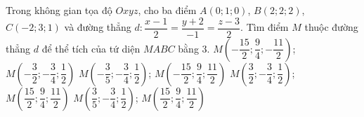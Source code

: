 \begin{ex}%
Trong không gian tọa độ $Oxyz$, cho ba điểm $A(0;1;0)$, $B(2;2;2)$, $C(-2;3;1)$  và đường thẳng $d:\dfrac{x-1}{2} = \dfrac{y+2}{-1} = \dfrac{z-3}{2}$. Tìm điểm $M$ thuộc đường thẳng $d$ để thể tích của tứ diện $MABC$ bằng $3$. 
\choice
{\True $M\left ( -\dfrac{15}{2} ; \dfrac{9}{4}; -\dfrac{11}{2}\right )$; $M\left ( -\dfrac{3}{2} ; -\dfrac{3}{4}; \dfrac{1}{2}\right )$}
{$M\left ( -\dfrac{3}{5} ; -\dfrac{3}{4}; \dfrac{1}{2}\right )$; $M\left ( -\dfrac{15}{2} ; \dfrac{9}{4}; \dfrac{11}{2}\right )$}
{$M\left ( \dfrac{3}{2} ; -\dfrac{3}{4}; \dfrac{1}{2}\right )$; $M\left ( \dfrac{15}{2} ; \dfrac{9}{4}; \dfrac{11}{2}\right )$}
{$M\left ( \dfrac{3}{5} ; -\dfrac{3}{4}; \dfrac{1}{2}\right )$; $M\left ( \dfrac{15}{2} ; \dfrac{9}{4}; \dfrac{11}{2}\right )$}
\end{ex}



